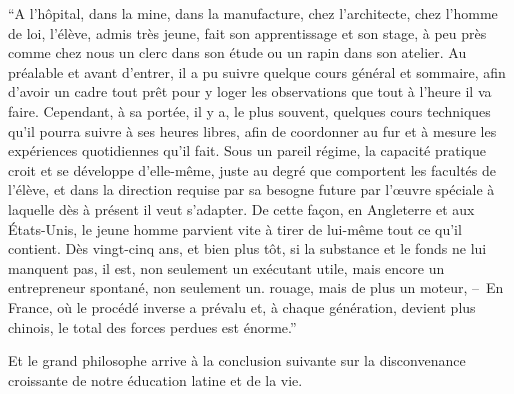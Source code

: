 \documentclass[french,twoside]{book} %
\begin{document}
“A l’hôpital, dans la mine, dans la manufacture, chez l’architecte, chez l’homme de loi, l’élève, admis très jeune, fait son apprentissage et son stage, à peu près comme chez nous un clerc dans son étude ou un rapin dans son atelier. Au préalable et avant d’entrer, il a pu suivre quelque cours général et sommaire, afin d’avoir un cadre tout prêt pour y loger les observations que tout à l’heure il va faire. Cependant, à sa portée, il y a, le plus souvent, quelques cours techniques qu’il pourra suivre à ses heures libres, afin de coordonner au fur et à mesure les expériences quotidiennes qu’il fait. Sous un pareil régime, la capacité pratique croit et se développe d’elle-même, juste au degré que comportent les facultés de l’élève, et dans la direction requise par sa besogne future par l’œuvre spéciale à laquelle dès à présent il veut s’adapter. De cette façon, en Angleterre et aux États-Unis, le jeune homme parvient vite à tirer de lui-même tout ce qu’il contient. Dès vingt-cinq ans, et bien plus tôt, si la substance et le fonds ne lui manquent pas, il est, non seulement un exécutant utile, mais encore un entrepreneur spontané, non seulement un. rouage, mais de plus un moteur, – En France, où le procédé inverse a prévalu et, à chaque génération, devient plus chinois, le total des forces perdues est énorme.”\par
Et le grand philosophe arrive à la conclusion suivante sur la disconvenance croissante de notre éducation latine et de la vie.\par
\end{document}
